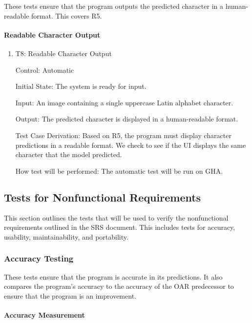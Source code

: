 \documentclass[12pt, titlepage]{article}
\begin{document}
These tests ensure that the program outputs the predicted character in a
human-readable format. This covers R5.

\paragraph{Readable Character Output}

\begin{enumerate}

\item{T8: Readable Character Output\\}

Control: Automatic

Initial State: The \progname{} system is ready for input.

Input: An image containing a single uppercase Latin alphabet character.

Output: The predicted character is displayed in a human-readable format.

Test Case Derivation: Based on R5, the program must display character
predictions in a readable format. We check to see if the UI displays the
same character that the model predicted.

How test will be performed: The automatic test will be run on GHA.

\end{enumerate}

\subsection{Tests for Nonfunctional Requirements}

This section outlines the tests that will be used to verify the nonfunctional
requirements outlined in the SRS document. This includes tests for accuracy,
usability, maintainability, and portability.

\subsubsection{Accuracy Testing}

These tests ensure that the program is accurate in its predictions. It also
compares the program's accuracy to the accuracy of the OAR predecessor to
ensure that the program is an improvement.

\paragraph{Accuracy Measurement}
\end{document}
